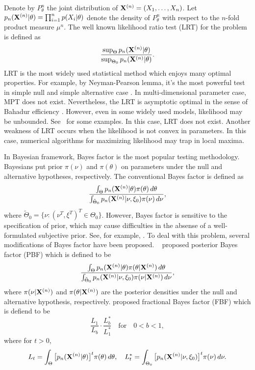\documentclass[3p]{elsarticle}
\theoremstyle{plain}
\theoremstyle{definition}
\theoremstyle{remark}
\begin{document}
Denote by $P_{\theta}^{n}$ the joint distribution of $\mathbf{X}^{(n)}=(X_1,\ldots, X_n)$.
Let $p_{n}(\mathbf{X}^{(n)}|\theta)=\prod_{i=1}^n p(X_i|\theta)$ denote the density of $P_{\theta}^n$ with respect to the $n$-fold product measure $\mu^n$.
The well known likelihood ratio test (LRT) for the problem is defined as
\begin{equation}
    \frac{\sup_{\Theta} p_n(\mathbf{X}^{(n)}|{\theta})}{\sup_{\Theta_0} p_n(\mathbf{X}^{(n)}|\theta)}.
\end{equation}
LRT is the most widely used statistical method which enjoys many optimal properties. For example, by Neyman-Pearson lemma, it's the most powerful test in simple null and simple alternative case \citep{Lehmann}.
In multi-dimensional parameter case, MPT does not exist.
Nevertheless, the LRT is asymptotic optimal in the sense of Bahadur efficiency \citep{MR0315820}.
However, even in some widely used models, likelihood may be unbounded. See~\cite{Cam1990Maximum} for some examples.
In this case, LRT does not exist. Another weakness of LRT occurs when the likelihood is not convex in parameters. In this case, numerical algorithms for maximizing likelihood may trap in local maxima. 



In Bayesian framework, Bayes factor is the most popular testing methodology.
Bayesians put prior $\pi(\nu)$ and $\pi(\theta)$ on parameters under the null and alternative hypotheses, respectively.
The conventional Bayes factor is defined as
\begin{equation*}
  \frac{\int_{\Theta} p_n(\mathbf{X}^{(n)}|\theta)\pi(\theta)\, d\theta}
    {\int_{\tilde{\Theta}_0}p_n(\mathbf{X}^{(n)}|\nu,\xi_0)\pi(\nu)\, d\nu},
\end{equation*}
where $\tilde{\Theta}_0=\{\nu: (\nu^T,\xi^T)^T\in \Theta_0\}$.
However, Bayes factor is sensitive to the specification of prior, which may cause difficulties in the absense of a well-formulated subjective prior. See, for example, \cite{Lindley1982}.
To deal with this problem, several modifications of Bayes factor have been proposed.
~\cite{Aitkin1991Posterior} proposed posterior Bayes factor (PBF) which is defined to be
\begin{equation*}
    \frac{\int_{\Theta} p_n(\mathbf{X}^{(n)}|\theta)\pi(\theta|\mathbf{X}^{(n)})\, d\theta}{\int_{\tilde{\Theta}_0}p_n(\mathbf{X}^{(n)}|\nu,\xi_0)\pi(\nu|\mathbf{X}^{(n)})\, d\nu},
\end{equation*}
where $\pi(\nu|\mathbf{X}^{(n)})$ and $\pi(\theta|\mathbf{X}^{(n)})$ are the posterior densities under the null and alternative hypothesis, respectively.
\cite{Fractional1995} proposed fractional Bayes factor (FBF) which is defiend to be
\begin{equation*}
    \frac{L_{1}}{L_{b}}\cdot \frac{L_{b}^*}{L_{1}^*}\quad \text{for}\quad 0<b<1,
\end{equation*}
where for $t>0$,
 $$
 L_t=\int_{\Theta}\big[p_n(\mathbf{X}^{(n)}|\theta)\big]^t \pi(\theta)\, d\theta,\quad
 L_t^*=\int_{\Theta_0}\big[p_n(\mathbf{X}^{(n)}|\nu,\xi_0)\big]^t \pi(\nu)\, d\nu.
 $$
\end{document}
